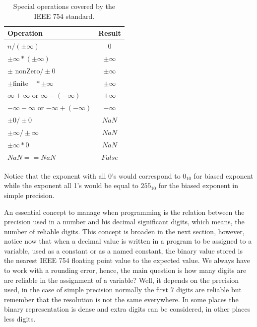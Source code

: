 \begin{table}
    \centering
    \begin{tabular}{| l | c |}
        \hline
        Operation & Result \\ \hline
        $ n / \left(\pm \infty\right) $            &     $	0$              \\ \hline
        $\pm \infty * \left( \pm \infty\right) $    &     $	\pm \infty$      \\ \hline
        $\pm$ nonZero$ / \pm 0 $            &    $	\pm \infty$       \\ \hline
        $\pm $finite$\quad * \pm \infty $      &    $	\pm \infty$       \\ \hline
        $\infty+\infty$  or  $\infty- \left(-\infty\right) $	     &       $+\infty$\\ \hline    
        $-\infty - \infty$   or  $-\infty + \left( -\infty \right) $   &        $	-\infty$\\ \hline
        $\pm 0 / \pm 0 $                  &        $	NaN$         \\ \hline
        $\pm \infty / \pm \infty $    &        $	NaN$     \\ \hline
        $\pm \infty * 0 $            &        $	NaN$     \\ \hline
        $ NaN == NaN $               &    $	False $      \\ \hline
    \end{tabular}
    \caption{Special operations covered by the IEEE 754 standard.}
    \label{tab:SpecialOperations}
\end{table}

Notice that the exponent with all 0's would correspond to $0_{10}$ for biased exponent while the exponent all 1's would be equal to $255_{10}$ for the biased exponent in simple precision.

An essential concept to manage when programming is the relation between the precision used in a number and his decimal significant digits, which means, the number of reliable digits. This concept is broaden in the next section, however, notice now that when a decimal value is written in a program to be assigned to a variable, used as a constant or as a named constant, the binary value stored is the nearest IEEE 754 floating point value to the expected value. We always have to work with a rounding error, hence, the main question is how many digits are are reliable in the assignment of a variable? Well, it depends on the precision used, in the case of simple precision normally the first 7 digits are reliable but remember that the resolution is not the same everywhere. In some places the binary representation is dense and extra digits can be considered, in other places less digits. 

